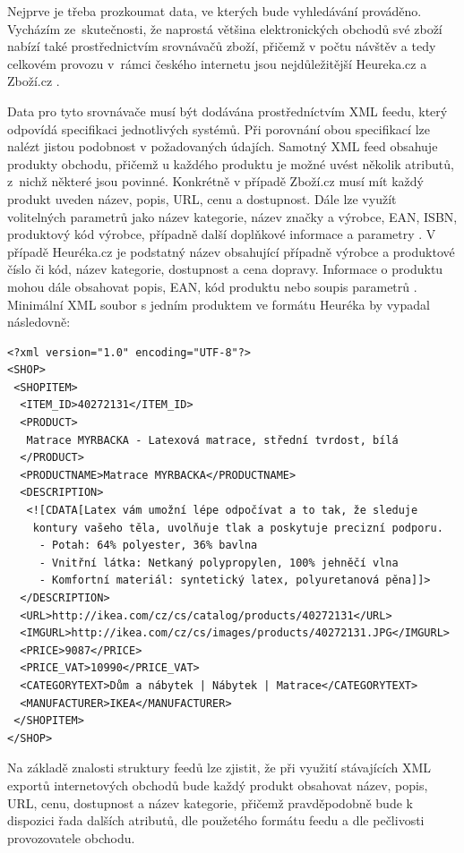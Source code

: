\documentclass[FM,DP]{tulthesis}
\begin{document}
Nejprve je třeba prozkoumat data, ve kterých bude vyhledávání prováděno. Vycházím
ze~skutečnosti, že naprostá většina elektronických obchodů své zboží nabízí také 
prostřednictvím srovnávačů zboží, přičemž v počtu návštěv a tedy celkovém provozu 
v~rámci českého internetu jsou nejdůležitější Heureka.cz a Zboží.cz \cite{netmonitor}. 

Data pro tyto srovnávače musí být dodávána prostředníctvím XML feedu, který odpovídá 
specifikaci jednotlivých systémů. Při porovnání obou specifikací lze nalézt 
jistou podobnost v požadovaných údajích. Samotný XML feed obsahuje
produkty obchodu, přičemž u každého produktu je možné uvést několik atributů, z~nichž
některé jsou povinné. Konkrétně v případě Zboží.cz musí mít každý produkt uveden název, 
popis, URL, cenu a dostupnost. Dále lze využít volitelných parametrů jako název kategorie, 
název značky a výrobce, EAN, ISBN, produktový kód výrobce, případně další doplňkové
informace a parametry \cite{xml-zbozi}. V případě Heuréka.cz je podstatný název
obsahující případně výrobce a produktové číslo či kód, název kategorie, dostupnost a
cena dopravy. Informace o produktu mohou dále obsahovat popis, EAN, kód produktu
nebo soupis parametrů \cite{xml-heureka}. Minimální XML soubor s jedním produktem 
ve formátu Heuréka by vypadal následovně:

\begin{verbatim}
<?xml version="1.0" encoding="UTF-8"?>
<SHOP>
 <SHOPITEM>
  <ITEM_ID>40272131</ITEM_ID>
  <PRODUCT>
   Matrace MYRBACKA - Latexová matrace, střední tvrdost, bílá
  </PRODUCT>
  <PRODUCTNAME>Matrace MYRBACKA</PRODUCTNAME>
  <DESCRIPTION>
   <![CDATA[Latex vám umožní lépe odpočívat a to tak, že sleduje
    kontury vašeho těla, uvolňuje tlak a poskytuje precizní podporu.
     - Potah: 64% polyester, 36% bavlna
     - Vnitřní látka: Netkaný polypropylen, 100% jehněčí vlna
     - Komfortní materiál: syntetický latex, polyuretanová pěna]]>
  </DESCRIPTION>
  <URL>http://ikea.com/cz/cs/catalog/products/40272131</URL>
  <IMGURL>http://ikea.com/cz/cs/images/products/40272131.JPG</IMGURL>
  <PRICE>9087</PRICE>
  <PRICE_VAT>10990</PRICE_VAT>
  <CATEGORYTEXT>Dům a nábytek | Nábytek | Matrace</CATEGORYTEXT>
  <MANUFACTURER>IKEA</MANUFACTURER>
 </SHOPITEM>
</SHOP>
\end{verbatim}

Na základě znalosti struktury feedů lze zjistit, že při využití stávajících XML exportů
internetových obchodů bude každý produkt obsahovat název, popis, URL, cenu, dostupnost
a název kategorie, přičemž pravděpodobně bude k dispozici řada dalších atributů, 
dle použetého formátu feedu a dle pečlivosti provozovatele obchodu.
\end{document}
